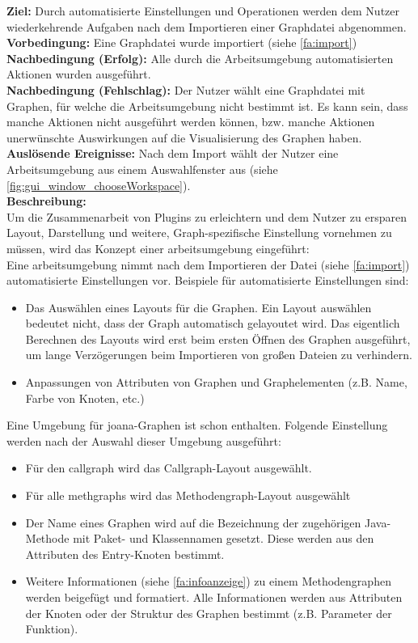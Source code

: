 \label{fa:umgebung}
\textbf{Ziel:} Durch automatisierte Einstellungen und Operationen werden dem Nutzer wiederkehrende Aufgaben nach dem Importieren einer Graphdatei abgenommen.\\
\textbf{Vorbedingung:} Eine Graphdatei wurde importiert (siehe \ref{fa:import})\\
\textbf{Nachbedingung (Erfolg):} Alle durch die Arbeitsumgebung automatisierten Aktionen wurden ausgeführt.\\
\textbf{Nachbedingung (Fehlschlag):} Der Nutzer wählt eine Graphdatei mit Graphen, für welche die Arbeitsumgebung nicht bestimmt ist. Es kann sein, dass manche Aktionen nicht ausgeführt werden können, bzw. manche Aktionen unerwünschte Auswirkungen auf die Visualisierung des Graphen haben.\\
\textbf{Auslösende Ereignisse:} Nach dem Import wählt der Nutzer eine Arbeitsumgebung aus einem Auswahlfenster aus (siehe \ref{fig:gui_window_chooseWorkspace}).\\
\textbf{Beschreibung:}\\
Um die Zusammenarbeit von Plugins zu erleichtern und dem Nutzer zu ersparen Layout, Darstellung und weitere,
 Graph-spezifische Einstellung vornehmen zu müssen, wird das Konzept einer \gls{arbeitsumgebung} eingeführt:\\
Eine \gls{arbeitsumgebung} nimmt nach dem Importieren der Datei (siehe \ref{fa:import}) automatisierte Einstellungen vor.
Beispiele für automatisierte Einstellungen sind:
\begin{itemize}
  \item Das Auswählen eines Layouts für die Graphen.
    Ein Layout auswählen bedeutet nicht, dass der Graph automatisch gelayoutet wird.
    Das eigentlich Berechnen des Layouts wird erst beim ersten Öffnen des Graphen ausgeführt, um lange Verzögerungen
    beim Importieren von großen Dateien zu verhindern.
  \item Anpassungen von Attributen von Graphen und Graphelementen (z.B. Name, Farbe von Knoten, etc.)
\end{itemize}
Eine Umgebung für \gls{joana}-Graphen ist schon enthalten. Folgende Einstellung werden nach der Auswahl dieser Umgebung ausgeführt:
\begin{itemize}
  \item Für den \gls{callgraph} wird das Callgraph-Layout ausgewählt.
  \item Für alle \glspl{methgraph} wird das Methodengraph-Layout ausgewählt
  \item Der Name eines Graphen wird auf die Bezeichnung der zugehörigen Java-Methode mit Paket- und Klassennamen gesetzt.
    Diese werden aus den Attributen des Entry-Knoten bestimmt.
  \item Weitere Informationen (siehe \ref{fa:infoanzeige}) zu einem Methodengraphen werden beigefügt und formatiert. Alle Informationen werden aus Attributen der Knoten oder der Struktur des Graphen bestimmt (z.B. Parameter der Funktion).
\end{itemize}

